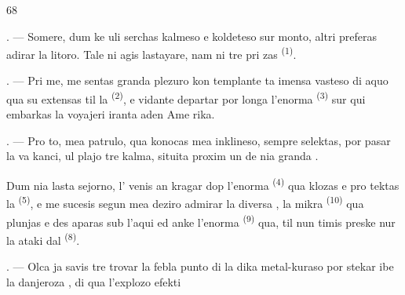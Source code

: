 
\begin{VUpage}[70]{68}
\VUsaut{4.0mm}
\VUsaut{3.0mm}
\VUsaut{3.0mm}

. --- Somere, dum ke uli serchas kalmeso\nl
e koldeteso sur monto, altri preferas adirar la\nl
litoro. Tale ni agis lastayare, nam ni tre pri\cc
zas  \textsuperscript{(1)}.

. --- Pri me, me sentas granda plezuro kon\cc
templante ta imensa vasteso di aquo qua su\nl
extensas til la  \textsuperscript{(2)}, e vidante departar\nl
por longa  l'enorma  \textsuperscript{(3)} sur\nl
qui embarkas la voyajeri iranta aden Ame\cc
rika.

. --- Pro to, mea patrulo, qua konocas mea\nl
inklineso, sempre selektas, por pasar la va\cc
kanci, ul plajo tre kalma, situita proxim un\nl
de nia granda .

\VUblancAlinea
Dum nia lasta sejorno, l' venis an\cc
kragar dop l'enorma  \textsuperscript{(4)} qua klozas e pro\cc
tektas la  \textsuperscript{(5)}, e me sucesis segun\nl
mea deziro admirar la diversa ,\nl
la mikra  \textsuperscript{(10)} qua plunjas e des\cc
aparas sub l'aqui ed anke l'enorma \cc
{} \textsuperscript{(9)} qua, til nun timis preske nur la ataki\nl
dal  \textsuperscript{(8)}.

\VUsaut{3.0mm}
\VUsaut{3.0mm}

. --- Olca ja savis tre  trovar la febla\nl
punto di la dika metal-kuraso por stekar ibe\nl
la danjeroza , di qua l'explozo efekti\cc
\parplein
\end{VUpage}

